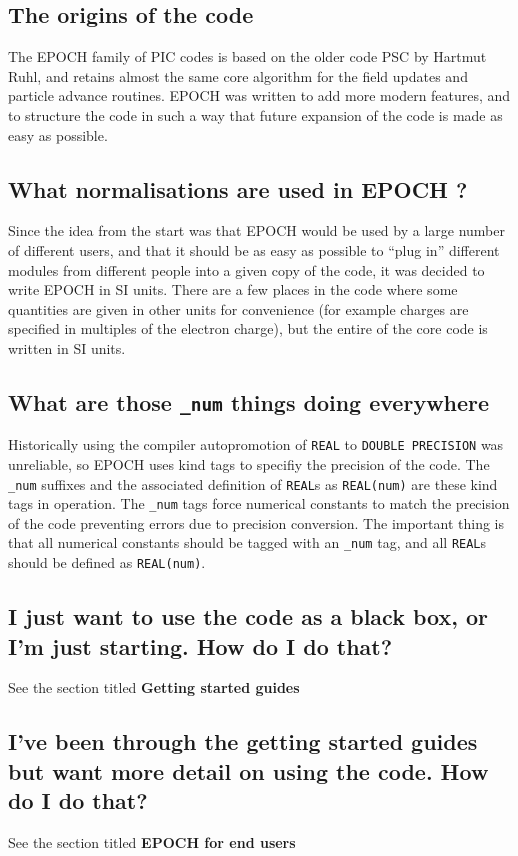 \documentclass[12pt]{article}
\newcommand{\code}[1]{{\texttt{#1}}}
\newcommand{\nEPOCH}{{\color{warwickdark}\fontfamily{phv}\selectfont EPOCH}}
\newcommand{\EPOCH}{{\nEPOCH} }
\begin{document}
\subsection{The origins of the code}
The \EPOCH family of PIC codes is based on the older code PSC by Hartmut Ruhl,
and retains almost the same core algorithm for the field updates and particle
advance routines. \EPOCH was written to add more modern features, and to
structure the code in such a way that future expansion of the code is made as
easy as possible.

\subsection{What normalisations are used in \EPOCH?}
Since the idea from the start was that \EPOCH would be used by a large number
of different users, and that it should be as easy as possible to ``plug in''
different modules from different people into a given copy of the code, it was
decided to write \EPOCH in SI units. There are a few places in the code where
some quantities are given in other units for convenience (for example charges
are specified in multiples of the electron charge), but the entire of the core
code is written in SI units.

\subsection{What are those \code{\_num} things doing everywhere}
Historically using the compiler autopromotion of \code{REAL} to
\code{DOUBLE PRECISION} was unreliable, so \EPOCH uses kind tags to specifiy
the precision of the code. The \code{\_num} suffixes and the associated
definition of \code{REAL}s as \code{REAL(num)} are these kind tags in
operation. The \code{\_num} tags force numerical constants to match the
precision of the code preventing errors due to precision conversion. The
important thing is that all numerical constants should be tagged with an
\code{\_num} tag, and all \code{REAL}s should be defined as \code{REAL(num)}.

\subsection{I just want to use the code as a black box, or I'm just
  starting. How do I do that?}
See the section titled {\bf Getting started guides}

\subsection{I've been through the getting started guides but want more detail
  on using the code. How do I do that?}
See the section titled {\bf \EPOCH for end users}
\end{document}
